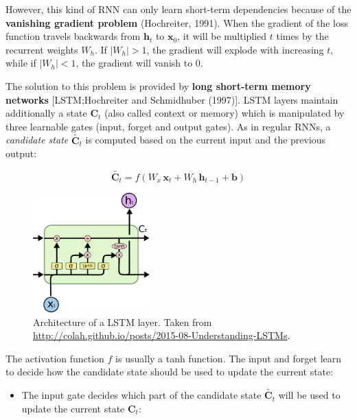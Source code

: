 \documentclass[
  letterpaper,
  DIV=11,
  numbers=noendperiod]{scrreprt}
\providecommand{\tightlist}{%
  \setlength{\itemsep}{0pt}\setlength{\parskip}{0pt}}\usepackage{longtable,booktabs,array}
\begin{document}
However, this kind of RNN can only learn short-term dependencies because
of the \textbf{vanishing gradient problem} (Hochreiter, 1991). When the
gradient of the loss function travels backwards from \(\mathbf{h}_t\) to
\(\mathbf{x}_0\), it will be multiplied \(t\) times by the recurrent
weights \(W_h\). If \(|W_h| > 1\), the gradient will explode with
increasing \(t\), while if \(|W_h| < 1\), the gradient will vanish to 0.

The solution to this problem is provided by \textbf{long short-term
memory networks} {[}LSTM;Hochreiter and Schmidhuber (1997){]}. LSTM
layers maintain additionally a state \(\mathbf{C}_t\) (also called
context or memory) which is manipulated by three learnable gates (input,
forget and output gates). As in regular RNNs, a \emph{candidate state}
\(\tilde{\mathbf{C}_t}\) is computed based on the current input and the
previous output:

\[
    \tilde{\mathbf{C}_t} = f(W_x \, \mathbf{x}_{t} + W_h \, \mathbf{h}_{t-1} + \mathbf{b})
\]

\begin{figure}

{\centering \includegraphics[width=0.4\textwidth,height=\textheight]{./img/LSTM.png}

}

\caption{\label{fig-lstm}Architecture of a LSTM layer. Taken from
\url{http://colah.github.io/posts/2015-08-Understanding-LSTMs}.}

\end{figure}

The activation function \(f\) is usually a tanh function. The input and
forget learn to decide how the candidate state should be used to update
the current state:

\begin{itemize}
\tightlist
\item
  The input gate decides which part of the candidate state
  \(\tilde{\mathbf{C}_t}\) will be used to update the current state
  \(\mathbf{C}_t\):
\end{itemize}
\end{document}

